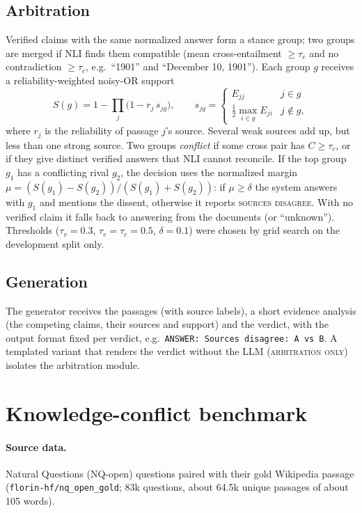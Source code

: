 \documentclass[11pt]{article}
\newcommand{\sys}[1]{\textsc{#1}}
\begin{document}
\subsection{Arbitration}
Verified claims with the same normalized answer form a stance group; two groups are merged if NLI
finds them compatible (mean cross-entailment $\ge\tau_e$ and no contradiction $\ge\tau_c$, e.g.\
``1901'' and ``December 10, 1901''). Each group $g$ receives a reliability-weighted noisy-OR support
\begin{equation}
  S(g) = 1-\prod_{j}\bigl(1-r_j\,s_{jg}\bigr),\qquad
  s_{jg}=\begin{cases} E_{jj} & j\in g\\ \tfrac12\max_{i\in g}E_{ji} & j\notin g,\end{cases}
\end{equation}
where $r_j$ is the reliability of passage $j$'s source. Several weak sources add up, but less than
one strong source. Two groups \emph{conflict} if some cross pair has $C\ge\tau_c$, or if they give
distinct verified answers that NLI cannot reconcile. If the top group $g_1$ has a conflicting rival
$g_2$, the decision uses the normalized margin
$\mu=(S(g_1)-S(g_2))/(S(g_1)+S(g_2))$: if $\mu\ge\delta$ the system answers with $g_1$ and mentions
the dissent, otherwise it reports \textsc{sources disagree}. With no verified claim it falls back
to answering from the documents (or ``unknown''). Thresholds ($\tau_v{=}0.3$, $\tau_e{=}\tau_c{=}0.5$,
$\delta{=}0.1$) were chosen by grid search on the development split only.

\subsection{Generation}
The generator receives the passages (with source labels), a short evidence analysis (the
competing claims, their sources and support) and the verdict, with the output format fixed per
verdict, e.g.\ \texttt{ANSWER: Sources disagree: A vs B}. A templated variant that renders the
verdict without the LLM (\sys{arbitration only}) isolates the arbitration module.

\section{Knowledge-conflict benchmark}
\paragraph{Source data.} Natural Questions (NQ-open) questions paired with their gold Wikipedia
passage (\texttt{florin-hf/nq\_open\_gold}; 83k questions, about 64.5k unique passages of
about 105 words).
\end{document}
